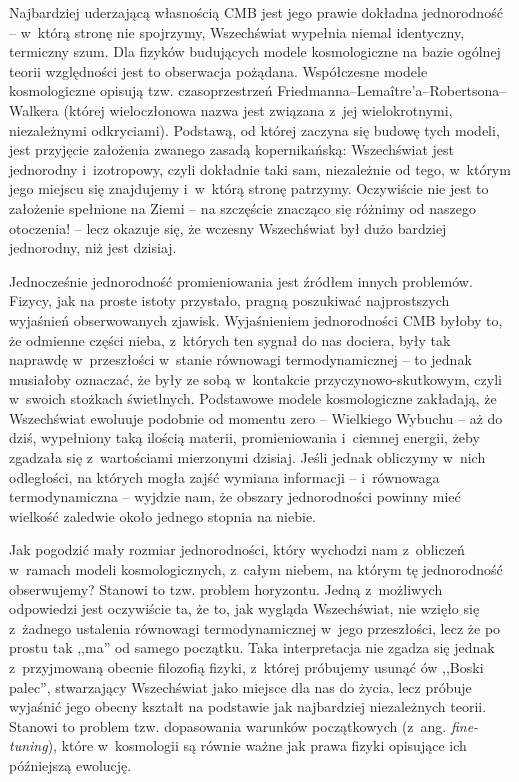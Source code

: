 \begin{dwieszpalty}
Najbardziej uderzającą własnością CMB jest jego prawie dokładna jednorodność -- w~którą stronę nie spojrzymy, Wszechświat wypełnia niemal identyczny, termiczny szum. Dla fizyków budujących modele kosmologiczne na bazie ogólnej teorii względności jest to obserwacja pożądana. Współczesne modele kosmologiczne opisują tzw. czasoprzestrzeń Friedmanna--Lemaître'a--Robertsona--Walkera (której wieloczłonowa nazwa jest związana z~jej wielokrotnymi, niezależnymi odkryciami).
Podstawą, od której zaczyna się budowę tych modeli, jest przyjęcie założenia zwanego zasadą kopernikańską:  Wszechświat jest jednorodny i~izotropowy, czyli dokładnie taki sam, niezależnie od tego, w~którym jego miejscu się znajdujemy i~w~którą stronę patrzymy. Oczywiście nie jest to założenie spełnione na Ziemi -- na szczęście znacząco się różnimy od naszego otoczenia! -- lecz okazuje się, że wczesny Wszechświat był dużo bardziej jednorodny, niż jest dzisiaj.

Jednocześnie jednorodność promieniowania jest źródłem  innych problemów. Fizycy, jak na proste istoty przystało, pragną poszukiwać najprostszych wyjaśnień obserwowanych zjawisk. Wyjaśnieniem jednorodności CMB byłoby to, że odmienne części nieba, z~których ten sygnał do nas dociera, były tak naprawdę w~przeszłości w~stanie równowagi termodynamicznej -- to jednak musiałoby oznaczać, że były ze sobą w~kontakcie przyczynowo-skutkowym, czyli w~swoich stożkach świetlnych. Podstawowe modele kosmologiczne zakładają, że Wszechświat ewoluuje podobnie od momentu zero -- Wielkiego Wybuchu -- aż do dziś, wypełniony taką ilością materii, promieniowania i~ciemnej energii, żeby zgadzała się z~wartościami mierzonymi dzisiaj. Jeśli jednak obliczymy w~nich odległości, na których mogła zajść wymiana informacji -- i~równowaga termodynamiczna -- wyjdzie nam, że obszary jednorodności powinny mieć wielkość zaledwie około jednego stopnia na niebie.

Jak pogodzić mały rozmiar jednorodności, który wychodzi nam z~obliczeń w~ramach modeli kosmologicznych, z~całym niebem, na którym tę jednorodność obserwujemy? Stanowi to tzw. problem horyzontu. Jedną z~możliwych odpowiedzi jest oczywiście ta, że to, jak wygląda Wszechświat, nie wzięło się z~żadnego ustalenia równowagi termodynamicznej w~jego przeszłości, lecz że po prostu tak ,,ma'' od samego początku. Taka interpretacja nie zgadza się jednak z~przyjmowaną obecnie filozofią fizyki, z~której próbujemy usunąć ów ,,Boski palec'', stwarzający Wszechświat jako miejsce dla nas do życia, lecz próbuje wyjaśnić jego obecny kształt na podstawie jak najbardziej niezależnych teorii. Stanowi to problem tzw. dopasowania warunków początkowych (z~ang. \textit{fine-tuning}), które w~kosmologii są równie ważne jak prawa fizyki opisujące ich późniejszą ewolucję.



\end{dwieszpalty}
